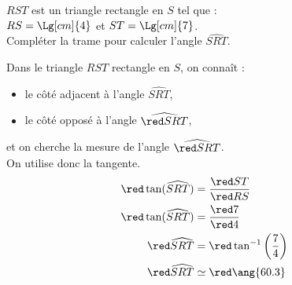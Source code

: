 \begin{corrige}
    $RST$ est un triangle rectangle en $S$ tel que :\\$RS=\Lg[cm]{4}$ et $ST=\Lg[cm]{7}$.\\
    Compléter la trame pour calculer l'angle $\widehat{SRT}$.
    \begin{center}
    \end{center}
    Dans le triangle $RST$ {\red rectangle} en {\red $S$}, on connaît :
    \begin{itemize}        
        \item le côté {\red adjacent} à l'angle $\widehat{SRT}$,
        \item le côté {\red opposé} à l'angle $\widehat{\red SRT}$,
    \end{itemize}
    et on cherche la mesure de l'angle $\widehat{\red SRT}$.\\ On utilise donc {\red la tangente}.
    \begin{align*}
        {\red \tan(\widehat{SRT})}&=\frac{\red ST}{\red RS}\\        
        {\red \tan(\widehat{SRT})}&=\frac{\red 7}{\red 4}\\                
        {\red \widehat{SRT}}&={\red \tan^{-1}\left(\frac{7}{4}\right)}\\
        {\red \widehat{SRT}}&\simeq {\red\ang{60.3}}
    \end{align*}
\end{corrige}

